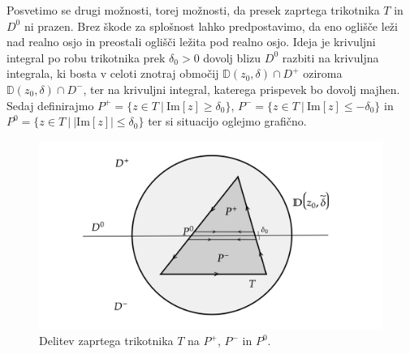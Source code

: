 \documentclass[mat1, tisk]{fmfdelo}
\begin{document}
\begin{dokaz}
        Posvetimo se drugi možnosti, torej možnosti, da presek zaprtega trikotnika $T$ in $D^0$ ni prazen. Brez škode za splošnost lahko predpostavimo, da eno oglišče leži nad realno osjo in preostali oglišči ležita pod realno osjo.
        Ideja je krivuljni integral po robu trikotnika prek $\delta_0 > 0$ dovolj blizu $D^0$ razbiti na krivuljna integrala, ki bosta v celoti znotraj območij $\mathbb{D}(z_0,\delta) \cap D^+$ oziroma $\mathbb{D}(z_0,\delta) \cap D^-$, 
        ter na krivuljni integral, katerega prispevek bo dovolj majhen.
        Sedaj definirajmo $P^+ = \{z \in T~|~\text{Im}[z] \geq \delta_0\}$, $P^- = \{z \in T~|~\text{Im}[z] \leq -\delta_0\}$ in $P^0 = \{z \in T~|~|\text{Im}[z]| \leq \delta_0\}$ ter si situacijo oglejmo grafično.

        \begin{figure}[H]
            \begin{center}
                \includegraphics[width = 0.9 \textwidth]{schwarz_hol_2.png}
                \caption{Delitev zaprtega trikotnika $T$ na $P^+$, $P^-$ in $P^0$.}
            \end{center}    
        \end{figure}
        

\end{dokaz}
\end{document}

